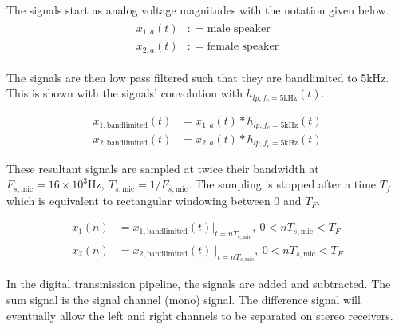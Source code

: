 \documentclass[journal]{IEEEtran}
\newcommand{\eqdef}{\mathrel{:\mathop=}}
\begin{document}


The signals start as analog voltage magnitudes with the notation given below.
\begin{gather*}
    \begin{aligned}
        x_{1,a}( t) & \eqdef \text{male speaker}   \\
        x_{2,a}( t) & \eqdef \text{female speaker}
    \end{aligned}
\end{gather*}


The signals  are then low pass filtered such that they are bandlimited to 5kHz.
This is shown with the signals' convolution with \(h_{lp,f_{c} =5\text{kHz}}(
t)\).



\begin{equation*}
    \begin{aligned}
        x_{1,\text{bandlimited}}( t) & =x_{1,a}( t) *h_{lp,f_{c} =5\text{kHz}}( t) \\
        x_{2,\text{bandlimited}}( t) & =x_{2,a}( t) *h_{lp,f_{c} =5\text{kHz}}( t)
    \end{aligned}
\end{equation*}


These resultant signals are sampled at twice their bandwidth at  \(\displaystyle
F_{s,\text{mic}} =16\times 10^{3}\text{Hz} ,\ T_{s,\text{mic}}
=1/F_{s,\text{mic}}\). The sampling is stopped after a time \(T_f\) which is
equivalent to rectangular windowing between 0 and \(\displaystyle T_{F}\).

\begin{equation*}
    \begin{aligned}
        x_{1}( n) & =x_{1,\text{bandlimited}}( t)\Bigr|_{t=nT_{s,\text{mic}}} ,\ 0< nT_{s,\text{mic}} < T_{F}    \\
        x_{2}( n) & =x_{2,\text{bandlimited}}( t) \ \Bigr|_{t=nT_{s,\text{mic}}} ,\ 0< nT_{s,\text{mic}} < T_{F}
    \end{aligned}
\end{equation*}

In the digital transmission pipeline, the signals are added and subtracted. The sum signal is the signal channel (mono) signal.
The difference signal will eventually allow the left and right channels to be separated on stereo receivers.
\end{document}
